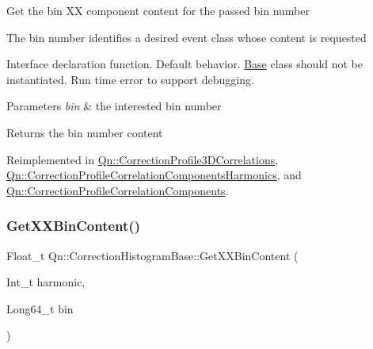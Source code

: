 Get the bin XX component content for the passed bin number

The bin number identifies a desired event class whose content is requested

Interface declaration function. Default behavior. \mbox{\hyperlink{classBase}{Base}} class should not be instantiated. Run time error to support debugging.


\begin{DoxyParams}{Parameters}
{\em bin} & the interested bin number \\
\hline
\end{DoxyParams}
\begin{DoxyReturn}{Returns}
the bin number content 
\end{DoxyReturn}


Reimplemented in \mbox{\hyperlink{classQn_1_1CorrectionProfile3DCorrelations_a2c06b157700f9e1c8a11d15df6b4b816}{Qn\+::\+Correction\+Profile3\+D\+Correlations}}, \mbox{\hyperlink{classQn_1_1CorrectionProfileCorrelationComponentsHarmonics_a4002be74c4146565fa0f93789b739463}{Qn\+::\+Correction\+Profile\+Correlation\+Components\+Harmonics}}, and \mbox{\hyperlink{classQn_1_1CorrectionProfileCorrelationComponents_a8bb785420ac0cb117b2af1047cb86bb2}{Qn\+::\+Correction\+Profile\+Correlation\+Components}}.

\mbox{\label{classQn_1_1CorrectionHistogramBase_ac28c760f664f1b52fb6bef3f85f7ce94}} 
\subsubsection{\texorpdfstring{Get\+X\+X\+Bin\+Content()}{GetXXBinContent()}\hspace{0.1cm}{\footnotesize\ttfamily [2/2]}}
{\footnotesize\ttfamily Float\+\_\+t Qn\+::\+Correction\+Histogram\+Base\+::\+Get\+X\+X\+Bin\+Content (\begin{DoxyParamCaption}\item[{Int\+\_\+t}]{harmonic,  }\item[{Long64\+\_\+t}]{bin }\end{DoxyParamCaption})\hspace{0.3cm}{\ttfamily [virtual]}}

